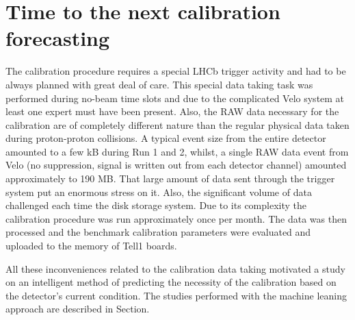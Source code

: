 \section{Time to the next calibration forecasting}
\label{chap4:wtte}

The calibration procedure requires a special LHCb trigger activity and had to be always planned with great deal of care. This special data taking task was performed during no-beam time slots and due to the complicated Velo system at least one expert must have been present. Also, the RAW data necessary for the calibration are of completely different nature than the regular physical data taken during proton-proton collisions. A typical event size from the entire detector amounted to a few kB during Run 1 and 2, whilst, a single RAW data event from Velo (no suppression, signal is written out from each detector channel) amounted approximately to 190 MB. That large amount of data sent through the trigger system put an enormous stress on it. Also, the significant volume of data challenged each time the disk storage system. Due to its complexity the calibration procedure was run approximately once per month. The data was then processed and the benchmark calibration parameters were evaluated and uploaded to the memory of Tell1 boards. 

All these inconveniences related to the calibration data taking motivated a study on an intelligent method of predicting the necessity of the calibration based on the detector's current condition. The studies performed with the machine leaning approach are described in Section.

